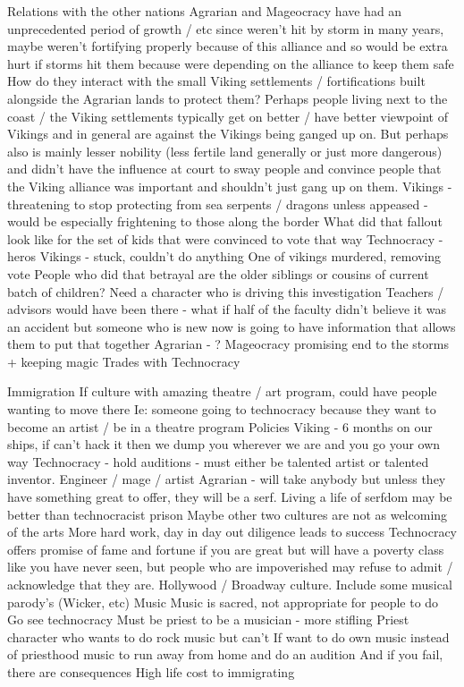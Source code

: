 \documentclass[blue]{GL2020}
\begin{document}
Relations with the other nations
Agrarian and Mageocracy have had an unprecedented period of growth / etc since weren’t hit by storm in many years, maybe weren’t fortifying properly because of this alliance and so would be extra hurt if storms hit them because were depending on the alliance to keep them safe
How do they interact with the small Viking settlements / fortifications built alongside the Agrarian lands to protect them?  Perhaps people living next to the coast / the Viking settlements typically get on better / have better viewpoint of Vikings and in general are against the Vikings being ganged up on.  But perhaps also is mainly lesser nobility (less fertile land generally or just more dangerous) and didn’t have the influence at court to sway people and convince people that the Viking alliance was important and shouldn’t just gang up on them.  
Vikings - threatening to stop protecting from sea serpents / dragons unless appeased - would be especially frightening to those along the border
What did that fallout look like for the set of kids that were convinced to vote that way
Technocracy - heros
Vikings - stuck, couldn’t do anything
One of vikings murdered, removing vote
People who did that betrayal are the older siblings or cousins of current batch of children?
Need a character who is driving this investigation
Teachers / advisors would have been there - what if half of the faculty didn’t believe it was an accident but someone who is new now is going to have information that allows them to put that together
Agrarian - ?
Mageocracy promising end to the storms + keeping magic 
Trades with Technocracy

Immigration
If culture with amazing theatre / art program, could have people wanting to move there
Ie: someone going to technocracy because they want to become an artist / be in a theatre program
Policies
Viking - 6 months on our ships, if can’t hack it then we dump you wherever we are and you go your own way
Technocracy - hold auditions - must either be talented artist or talented inventor.  Engineer / mage / artist
Agrarian - will take anybody but unless they have something great to offer, they will be a serf.  Living a life of serfdom may be better than technocracist prison
Maybe other two cultures are not as welcoming of the arts
More hard work, day in day out diligence leads to success
Technocracy offers promise of fame and fortune if you are great but will have a poverty class like you have never seen, but people who are impoverished may refuse to admit / acknowledge that they are.  Hollywood / Broadway culture.  Include some musical parody’s (Wicker, etc)
Music
Music is sacred, not appropriate for people to do
Go see technocracy 
Must be priest to be a musician - more stifling
Priest character who wants to do rock music but can’t
If want to do own music instead of priesthood music to run away from home and do an audition
And if you fail, there are consequences
High life cost to immigrating
\end{document}
